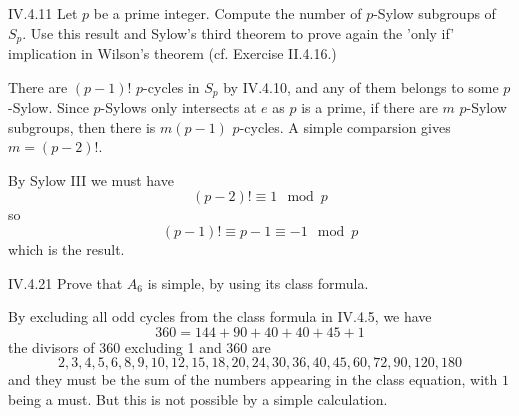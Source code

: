 \begin{problem}{IV.4.11}
Let $p$ be a prime integer. Compute the number of $p$-Sylow subgroups of $S_p$. Use this result and Sylow's third theorem to prove again the 'only if' implication in Wilson's theorem (cf. Exercise II.4.16.)
\end{problem}
\begin{pf}
There are $(p-1)!$ $p$-cycles in $S_p$ by IV.4.10, and any of them belongs to some $p$-Sylow. Since $p$-Sylows only intersects at $e$ as $p$ is a prime, if there are $m$ $p$-Sylow subgroups, then there is $m(p-1)$ $p$-cycles. A simple comparsion gives $m = (p-2)!$.

By Sylow III we must have
\[
(p-2)! \equiv 1 \mod p	
\]
so
\[
(p-1)! \equiv p-1 \equiv -1 \mod p
\]
which is the result.
\end{pf}

\begin{problem}{IV.4.21}
Prove that $A_6$ is simple, by using its class formula.
\end{problem}
\begin{pf}
By excluding all odd cycles from the class formula in IV.4.5, we have
\[
360 = 144 + 90 + 40 + 40 + 45 + 1
\]
the divisors of 360 excluding 1 and 360 are
\[
2, 3, 4, 5, 6, 8, 9, 10, 12, 15, 18, 20, 24 ,30, 36 ,40, 45, 60, 72, 90, 120, 180
\]
and they must be the sum of the numbers appearing in the class equation, with $1$ being a must. But this is not possible by a simple calculation. 
\end{pf}

\section{}

